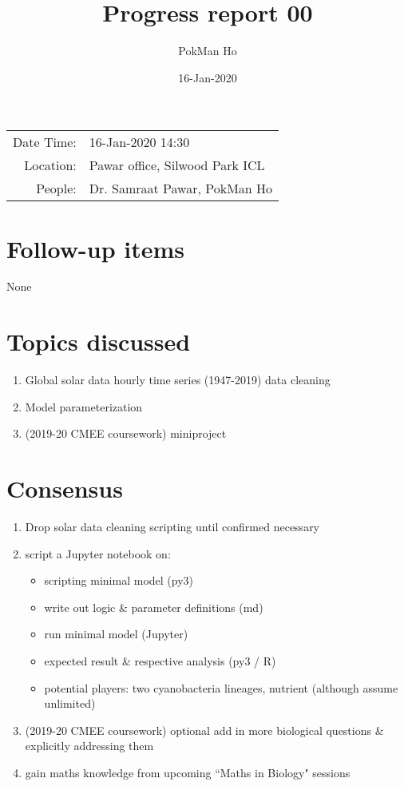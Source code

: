 \documentclass[a4paper,11pt]{article}
\title{Progress report 00}
\author{PokMan Ho}
\date{16-Jan-2020}
\begin{document}
    \maketitle
    
    \begin{tabular}{rl}
        Date Time: & 16-Jan-2020 14:30 \\
        Location: & Pawar office, Silwood Park ICL \\
        People: & Dr. Samraat Pawar, PokMan Ho \\
    \end{tabular}
    \section{Follow-up items}
    None
    \section{Topics discussed}
    \begin{enumerate}
        \item Global solar data hourly time series (1947-2019) data cleaning
        \item Model parameterization
        \item (2019-20 CMEE coursework) miniproject
    \end{enumerate}
    \section{Consensus}
    \begin{enumerate}
        \item Drop solar data cleaning scripting until confirmed necessary
        \item script a Jupyter notebook on:
        \begin{itemize}
            \item scripting minimal model (py3)
            \item write out logic \& parameter definitions (md)
            \item run minimal model (Jupyter)
            \item expected result \& respective analysis (py3 / R)
            \item potential players: two cyanobacteria lineages, nutrient (although assume unlimited)
        \end{itemize}
        \item (2019-20 CMEE coursework) optional add in more biological questions \& explicitly addressing them
        \item gain maths knowledge from upcoming ``Maths in Biology" sessions
    \end{enumerate}
\end{document}
